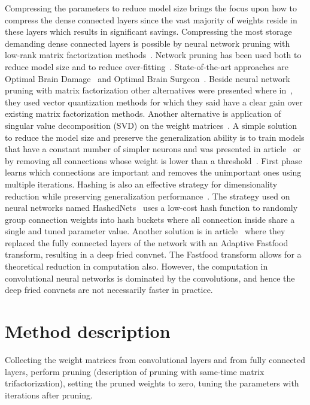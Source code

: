\documentclass{article} %
\begin{document}
Compressing the parameters to reduce model size brings the focus upon how to compress the dense connected layers since the vast majority of weights reside in these layers which results in significant savings. Compressing the most storage demanding dense connected layers is possible by neural network pruning with low-rank matrix factorization methods~\cite{bondarenko2014artificial, schmidhuber2015deep, sainath2013low}. Network pruning has been used both to reduce model size and to reduce over-fitting~\cite{han2015learning}. State-of-the-art approaches are Optimal Brain Damage~\cite{lecun1989optimal} and Optimal Brain Surgeon~\cite{hassibi1993optimal}. Beside neural network pruning with matrix factorization other alternatives were presented where in~\cite{ DBLP:journals/corr/GongLYB14}, they used vector quantization methods for which they said have a clear gain over existing matrix factorization methods. Another alternative is application of singular value decomposition (SVD) on the weight matrices~\cite{xue2013restructuring}. A simple solution to reduce the model size and preserve the generalization ability is to train models that have a constant number of simpler neurons and was presented in article~\cite{collins2014memory} or by removing all connections whose weight is lower than a threshold~\cite{han2015learning}. First phase learns which connections are important and removes the unimportant ones using multiple iterations. Hashing is also an effective strategy for dimensionality reduction while preserving generalization performance~\cite{weinberger2009feature, shi2009hash}. The strategy used on neural networks named HashedNets~\cite{chen2015compressing} uses a low-cost hash function to randomly group connection weights into hash buckets where all connection inside share a single and tuned parameter value.  Another solution is in article~\cite{yang2014deep} where they replaced the fully connected layers of the network with an Adaptive Fastfood transform, resulting in a deep fried convnet. The Fastfood transform allows for a theoretical reduction in computation also. However, the computation in convolutional neural networks is dominated by the convolutions, and hence the deep fried convnets are not necessarily faster in practice. 


\section{Method description}
Collecting the weight matrices from convolutional layers and from fully connected layers, perform pruning (description of pruning with same-time matrix trifactorization), setting the pruned weights to zero, tuning the parameters with iterations after pruning.
\end{document}
